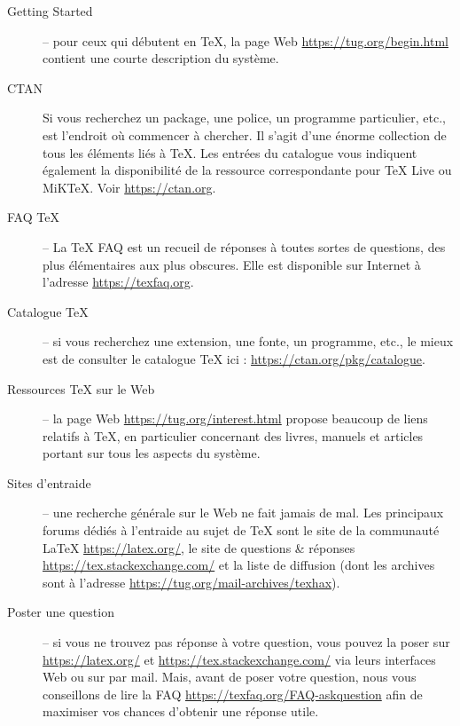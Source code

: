 \documentclass[german, english, french, 12pt]{article}
\renewcommand{\TL}{\TeX{} Live\xspace}%
\begin{document}
\begin{description}
\item[Getting Started] -- pour ceux qui débutent en \TeX, la page Web
  \url{https://tug.org/begin.html} contient une courte description du système.

\item [CTAN] Si vous recherchez un package, une police, un programme
  particulier, etc., \CTAN{} est l'endroit où commencer à chercher. Il s'agit
  d'une énorme collection de tous les éléments liés à \TeX{}. Les entrées du
  catalogue vous indiquent également la disponibilité de la ressource
  correspondante pour \TL{} ou MiK\TeX. Voir \url{https://ctan.org}.

\item [FAQ \TeX{}] -- La \TeX{} FAQ est un recueil de réponses à toutes sortes
  de questions, des plus élémentaires aux plus obscures. Elle est disponible sur
  Internet à l'adresse \url{https://texfaq.org}.

\item[Catalogue \TeX{}] -- si vous recherchez une extension, une fonte, un
  programme, etc., le mieux est de consulter le catalogue \TeX{} %
  ici : \url{https://ctan.org/pkg/catalogue}.

\item[Ressources \TeX{} sur le Web] -- la page Web
  \url{https://tug.org/interest.html} propose beaucoup de liens relatifs
  à \TeX{}, en particulier concernant des livres, manuels et articles portant
  sur tous les aspects du système.

\item[Sites d'entraide] -- une recherche générale sur le Web ne fait jamais de
  mal. Les principaux forums dédiés à l'entraide au sujet de \TeX{} sont le site
  de la communauté \LaTeX{} \url{https://latex.org/}, le site de questions \&
réponses \url{https://tex.stackexchange.com/} et la liste de diffusion
 (dont les archives sont à l'adresse
\url{https://tug.org/mail-archives/texhax}).

\item[Poster une question] -- si vous ne trouvez pas réponse à votre question,
  vous pouvez la poser sur \url{https://latex.org/} et
\url{https://tex.stackexchange.com/} via leurs interfaces Web ou sur
 par mail. Mais, avant de poser votre question, nous vous
conseillons de lire la FAQ \url{https://texfaq.org/FAQ-askquestion} afin de
maximiser vos chances d'obtenir une réponse utile.
\end{description}
\end{document}

